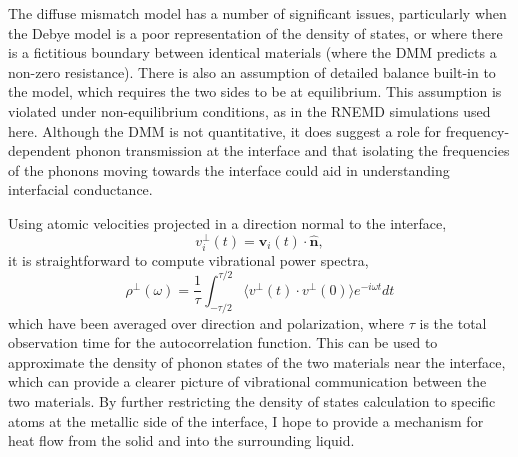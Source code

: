 The diffuse mismatch model has a number of significant issues,
particularly when the Debye model is a poor representation of the
density of states, or where there is a fictitious boundary between
identical materials (where the DMM predicts a non-zero
resistance).\cite{Monachon2016} There is also an assumption of
detailed balance built-in to the model,\cite{Chen2005} which requires
the two sides to be at equilibrium.  This assumption is violated under
non-equilibrium conditions, as in the RNEMD simulations used
here. Although the DMM is not quantitative, it does suggest a role for
frequency-dependent phonon transmission at the interface and 
that isolating the frequencies of the phonons moving
towards the interface could aid in understanding interfacial
conductance. 

Using atomic velocities projected in a direction normal to the
interface,
\begin{equation}
v^{\perp}_i(t) = \mathbf{v}_i(t) \cdot \hat{\mathbf{n}}, 
\end{equation}
it is straightforward to compute vibrational power spectra,
\begin{equation}
  \rho^\perp (\omega) = \frac{1}{\tau} \int_{-\tau/2}^{\tau/2} \langle v^{\perp}(t) \cdot v^{\perp}(0) \rangle e^{-i\omega t} dt
\label{eq:DOS}
\end{equation}
which have been averaged over direction and polarization, where $\tau$
is the total observation time for the autocorrelation function.  
This can be used to approximate the density of phonon states of the two
materials near the interface, which can provide a clearer picture of
vibrational communication between the two materials. 
By further restricting the density of states calculation to specific
atoms at the metallic side of the interface, I hope to provide a
mechanism for heat flow from the solid and into the surrounding
liquid.

